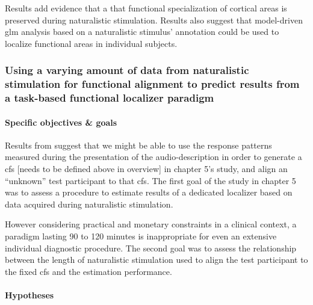 Results add evidence \citep[cf.][]{bartels2004mapping} that a that functional
specialization of cortical areas is preserved during naturalistic stimulation.
%
Results also suggest that model-driven \ac{glm} analysis based on a naturalistic
stimulus' annotation could be used to localize functional areas in individual
subjects.



\subsubsection{Using a varying amount of data from naturalistic stimulation for
functional alignment to predict results from a task-based functional localizer
paradigm}






\paragraph{Specific objectives \& goals}
%
Results from \citet{haeusler2022processing} suggest that we might be able
to use the response patterns measured during the presentation of the
audio-description in order to generate a \ac{cfs} [needs to be defined above in
overview] in chapter 5's study, and align an ``unknown'' test participant to
that \ac{cfs}.
%
The first goal of the study in chapter 5 was to assess a procedure to
estimate results of a dedicated localizer \citep{sengupta2016extension} based on
data acquired during naturalistic stimulation.

%
However considering practical and monetary constraints in a clinical context, a
paradigm lasting 90 to 120 minutes is inappropriate for even an extensive
individual diagnostic procedure.
The second goal was to assess the relationship between the length of
naturalistic stimulation used to align the test participant to the fixed
\ac{cfs} and the estimation performance.


\paragraph{Hypotheses}

